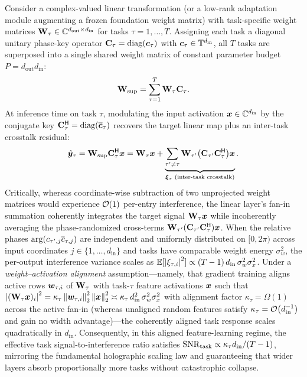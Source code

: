 Consider a complex-valued linear transformation (or a low-rank adaptation module augmenting a frozen foundation weight matrix) with task-specific weight matrices $\mathbf{W}_\tau \in \mathbb{C}^{d_{\mathrm{out}} \times d_{\mathrm{in}}}$ for tasks $\tau = 1, \dots, T$.
Assigning each task a diagonal unitary phase-key operator $\mathbf{C}_\tau = \operatorname{diag}(\boldsymbol{c}_\tau)$ with $\boldsymbol{c}_\tau \in \mathbb{T}^{d_{\mathrm{in}}}$, all $T$ tasks are superposed into a single shared weight matrix of constant parameter budget $P = d_{\mathrm{out}} d_{\mathrm{in}}$:
\begin{equation}\label{eq:continual_superposition}
    \mathbf{W}_{\mathrm{sup}} = \sum_{\tau=1}^{T} \mathbf{W}_\tau \mathbf{C}_\tau.
\end{equation}
At inference time on task $\tau$, modulating the input activation $\boldsymbol{x} \in \mathbb{C}^{d_{\mathrm{in}}}$ by the conjugate key $\mathbf{C}_\tau^{\mathsf{H}} = \operatorname{diag}(\overline{\boldsymbol{c}}_\tau)$ recovers the target linear map plus an inter-task crosstalk residual:
\begin{equation}\label{eq:continual_readout}
    \hat{\boldsymbol{y}}_\tau
    = \mathbf{W}_{\mathrm{sup}} \mathbf{C}_\tau^{\mathsf{H}} \boldsymbol{x}
    = \mathbf{W}_\tau \boldsymbol{x}
      + \underbrace{\sum_{\tau' \neq \tau} \mathbf{W}_{\tau'} \bigl(\mathbf{C}_{\tau'} \mathbf{C}_\tau^{\mathsf{H}}\bigr) \boldsymbol{x}}_{\boldsymbol{\xi}_\tau \text{ (inter-task crosstalk)}}.
\end{equation}
Critically, whereas coordinate-wise subtraction of two unprojected weight matrices would experience $\mathcal{O}\!\left(1\right)$ per-entry interference, the linear layer's fan-in summation coherently integrates the target signal $\mathbf{W}_\tau \boldsymbol{x}$ while incoherently averaging the phase-randomized cross-terms $\mathbf{W}_{\tau'}(\mathbf{C}_{\tau'}\mathbf{C}_\tau^{\mathsf{H}})\boldsymbol{x}$.
When the relative phases $\arg(c_{\tau',j}\overline{c}_{\tau,j})$ are independent and uniformly distributed on $[0, 2\pi)$ across input coordinates $j \in \{1,\dots,d_{\mathrm{in}}\}$ and tasks have comparable weight energy $\sigma_w^2$, the per-output interference variance scales as $\mathbb{E}[\left\lvert \xi_{\tau,i} \right\rvert^2] \propto (T - 1)\, d_{\mathrm{in}}\, \sigma_w^2 \sigma_x^2$.
Under a \emph{weight--activation alignment} assumption---namely, that gradient training aligns active rows $\boldsymbol{w}_{\tau,i}$ of $\mathbf{W}_\tau$ with task-$\tau$ feature activations $\boldsymbol{x}$ such that $\left\lvert (\mathbf{W}_\tau \boldsymbol{x})_i \right\rvert^2 = \kappa_\tau \left\lVert \boldsymbol{w}_{\tau,i} \right\rVert_2^2 \left\lVert \boldsymbol{x} \right\rVert_2^2 \asymp \kappa_\tau\, d_{\mathrm{in}}^2\, \sigma_w^2 \sigma_x^2$ with alignment factor $\kappa_\tau = \Omega(1)$ across the active fan-in (whereas unaligned random features satisfy $\kappa_\tau = \mathcal{O}\!\left(d_{\mathrm{in}}^{-1}\right)$ and gain no width advantage)---the coherently aligned task response scales quadratically in $d_{\mathrm{in}}$.
Consequently, in this aligned feature-learning regime, the effective task signal-to-interference ratio satisfies $\mathrm{SNR}_{\mathrm{task}} \propto \kappa_\tau d_{\mathrm{in}} / (T - 1)$, mirroring the fundamental holographic scaling law and guaranteeing that wider layers absorb proportionally more tasks without catastrophic collapse.


